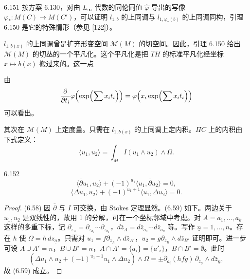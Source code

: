 \begin{remark}{6.151}
  按方案 6.130，对由 $L_{\infty}$ 代数的同伦同值 $\hat\varphi$ 导出的写像 $\varphi_*:M(C)\to M(C')$，可以证明 $l_{1,b}$ 的上同调与 $l_{1,\varphi_*(b)}$ 的上同调同构，引理 6.150 是它的特殊情形（参见 [122]）。
\end{remark}

$l_{1,b(x)}$ 的上同调曾是扩充形变空间 $\mathcal{M}(M)$ 的切空间。因此，引理 6.150 给出 $\mathcal{M}(M)$ 的切丛的一个平凡化。这个平凡化是把 $TH$ 的标准平凡化经坐标 $x\mapsto b(x)$ 搬过来的。这一点


由
\[
  \frac{\partial}{\partial t_i}\varphi\Bigl(\exp\Bigl(\sum x_it_i\Bigr)\Bigr)
  =\varphi\Bigl(x_i\exp\Bigl(\sum x_it_i\Bigr)\Bigr)
\]
可以看出。

其次在 $\mathcal{M}(M)$ 上定度量。只需在 $l_{1,b(x)}$ 的上同调上定内积。$\Pi C$ 上的内积由下式定义：
\begin{equation}
  \langle u_1,u_2\rangle=\int_MI(u_1\wedge u_2)\wedge\Omega. \tag{6.57}
\end{equation}

\begin{lemma*}{6.152}
  \begin{equation}
    \langle\bar\partial u_1,u_2\rangle+(-1)^{u_1}\langle u_1,\bar\partial u_2\rangle=0, \tag{6.58}
  \end{equation}
  \begin{equation}
    \langle\Delta u_1,u_2\rangle+(-1)^{u_1+1}\langle u_1,\Delta u_2\rangle=0. \tag{6.59}
  \end{equation}
\end{lemma*}

\begin{proof}
  (6.58) 因 $\bar\partial$ 与 $I$ 可交换，由 Stokes 定理显然。(6.59) 如下。两边关于 $u_1,u_2$ 是双线性的，故用 1 的分解，可在一个坐标邻域中考虑。对 $A=a_1,\dots,a_k$ 这样的多重下标，记 $\partial_{z_A}=\partial_{z_{a_1}}\cdots\partial_{z_{a_k}}$，$d\bar z_A=d\bar z_{a_1}\cdots d\bar z_{a_k}$ 等。写作 $\underline{n}=1,\dots,n$。存在 $h$ 使 $\Omega=h\,dz_{\underline{n}}$。只需对 $u_1=f\partial_{z_A}\wedge d\bar z_{A'}$，$u_2=g\partial_{z_B}\wedge d\bar z_{B'}$ 证明即可。进一步可设 $A\cup A'=\underline{n}$，$B\cup B'=\underline{n}$，$A\cap A'=\{a_i\}=\{a'_i\}$，$B\cap B'=\emptyset$。此时
  \[
    (\Delta u_1\wedge u_2+(-1)^{u_1+1}u_1\wedge\Delta u_2)\wedge\Omega
    =\pm\partial_{a_i}(hfg)\,\partial_{z_{\underline{n}}}\wedge d\bar z_{\underline{n}},
  \]
  故 (6.59) 成立。
\end{proof}

